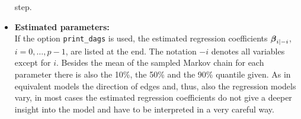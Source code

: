 \begin{itemize}
step.
\item {\bf\sffamily Estimated parameters:}\\
If the option {\tt print\_dags} is used, the estimated regression
coefficients $\mbox{\boldmath $\beta$}_{i \mid -i}$, $i=0, \dots, p-1$, are listed
at the end. The notation $-i$ denotes all variables except for
$i$. Besides the mean of the sampled Markov chain for each
parameter there is also the 10\%, the 50\% and the 90\% quantile
given. As in equivalent models the direction of edges and, thus,
also the regression models vary, in most cases the estimated
regression coefficients do not give a deeper insight into the
model and have to be interpreted in a very careful way.
\end{itemize}

